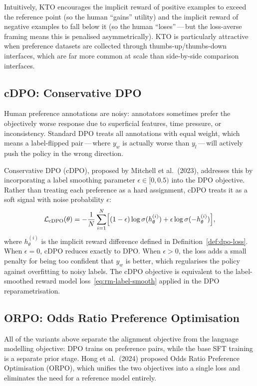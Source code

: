 Intuitively, KTO encourages the implicit reward of positive examples to exceed the reference point (so the human ``gains'' utility) and the implicit reward of negative examples to fall below it (so the human ``loses''\,---\,but the loss-averse framing means this is penalised asymmetrically). KTO is particularly attractive when preference datasets are collected through thumbs-up/thumbs-down interfaces, which are far more common at scale than side-by-side comparison interfaces.

\subsection{cDPO: Conservative DPO}

Human preference annotations are noisy: annotators sometimes prefer the objectively worse response due to superficial features, time pressure, or inconsistency. Standard DPO treats all annotations with equal weight, which means a label-flipped pair\,---\,where $y_w$ is actually worse than $y_l$\,---\,will actively push the policy in the wrong direction.

Conservative DPO (cDPO), proposed by Mitchell et al.\ (2023), addresses this by incorporating a label smoothing parameter $\epsilon \in [0, 0.5)$ into the DPO objective. Rather than treating each preference as a hard assignment, cDPO treats it as a soft signal with noise probability $\epsilon$:
\begin{equation}
\label{eq:cdpo-loss}
\mathcal{L}_\mathrm{cDPO}(\theta)
= -\frac{1}{N}\sum_{i=1}^{N}
\Bigl[
(1 - \epsilon)\log\sigma(h^{(i)}_\theta)
+ \epsilon\log\sigma(-h^{(i)}_\theta)
\Bigr],
\end{equation}
where $h^{(i)}_\theta$ is the implicit reward difference defined in Definition~\ref{def:dpo-loss}. When $\epsilon = 0$, cDPO reduces exactly to DPO. When $\epsilon > 0$, the loss adds a small penalty for being too confident that $y_w$ is better, which regularises the policy against overfitting to noisy labels. The cDPO objective is equivalent to the label-smoothed reward model loss~\eqref{eq:rm-label-smooth} applied in the DPO reparametrisation.

\subsection{ORPO: Odds Ratio Preference Optimisation}

All of the variants above separate the alignment objective from the language modelling objective: DPO trains on preference pairs, while the base SFT training is a separate prior stage. Hong et al.\ (2024) proposed Odds Ratio Preference Optimisation (ORPO), which unifies the two objectives into a single loss and eliminates the need for a reference model entirely.

